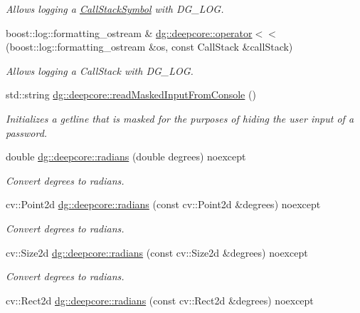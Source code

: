 \begin{DoxyCompactItemize}
\begin{DoxyCompactList}\small\item\em Allows logging a \hyperlink{structdg_1_1deepcore_1_1_call_stack_symbol}{Call\+Stack\+Symbol} with D\+G\+\_\+\+L\+OG. \end{DoxyCompactList}\item 
boost\+::log\+::formatting\+\_\+ostream \& \hyperlink{group___utility_module_ga34296a075c256c17fe8ba2f1f6d18372}{dg\+::deepcore\+::operator$<$$<$} (boost\+::log\+::formatting\+\_\+ostream \&os, const Call\+Stack \&call\+Stack)
\begin{DoxyCompactList}\small\item\em Allows logging a Call\+Stack with D\+G\+\_\+\+L\+OG. \end{DoxyCompactList}\item 
std\+::string \hyperlink{group___utility_module_ga3d0cf89b2a18e61bc8c07ae4006c9744}{dg\+::deepcore\+::read\+Masked\+Input\+From\+Console} ()
\begin{DoxyCompactList}\small\item\em Initializes a getline that is masked for the purposes of hiding the user input of a password. \end{DoxyCompactList}\item 
double \hyperlink{group___utility_module_ga547c4f80c778878854c572c297cc1983}{dg\+::deepcore\+::radians} (double degrees) noexcept
\begin{DoxyCompactList}\small\item\em Convert degrees to radians. \end{DoxyCompactList}\item 
cv\+::\+Point2d \hyperlink{group___utility_module_ga8ce4d2c11e35fe075404a256c272b4d8}{dg\+::deepcore\+::radians} (const cv\+::\+Point2d \&degrees) noexcept
\begin{DoxyCompactList}\small\item\em Convert degrees to radians. \end{DoxyCompactList}\item 
cv\+::\+Size2d \hyperlink{group___utility_module_gabf4e708fbdf32c6c93035b918d7ffa03}{dg\+::deepcore\+::radians} (const cv\+::\+Size2d \&degrees) noexcept
\begin{DoxyCompactList}\small\item\em Convert degrees to radians. \end{DoxyCompactList}\item 
cv\+::\+Rect2d \hyperlink{group___utility_module_ga7712032c74d8bc4e9c392964d4e18e8c}{dg\+::deepcore\+::radians} (const cv\+::\+Rect2d \&degrees) noexcept

\end{DoxyCompactItemize}
